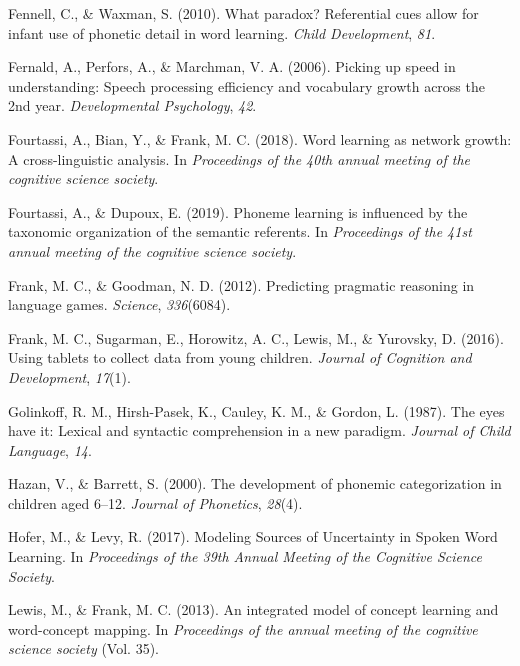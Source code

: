 \documentclass[english,,man]{apa6}
\begin{document}
\leavevmode\hypertarget{ref-fennell2010}{}%
Fennell, C., \& Waxman, S. (2010). What paradox? Referential cues allow for infant use of phonetic detail in word learning. \emph{Child Development}, \emph{81}.

\leavevmode\hypertarget{ref-fernald2006}{}%
Fernald, A., Perfors, A., \& Marchman, V. A. (2006). Picking up speed in understanding: Speech processing efficiency and vocabulary growth across the 2nd year. \emph{Developmental Psychology}, \emph{42}.

\leavevmode\hypertarget{ref-fourtassi2018}{}%
Fourtassi, A., Bian, Y., \& Frank, M. C. (2018). Word learning as network growth: A cross-linguistic analysis. In \emph{Proceedings of the 40th annual meeting of the cognitive science society}.

\leavevmode\hypertarget{ref-fourtassi2019}{}%
Fourtassi, A., \& Dupoux, E. (2019). Phoneme learning is influenced by the taxonomic organization of the semantic referents. In \emph{Proceedings of the 41st annual meeting of the cognitive science society}.

\leavevmode\hypertarget{ref-frank2012}{}%
Frank, M. C., \& Goodman, N. D. (2012). Predicting pragmatic reasoning in language games. \emph{Science}, \emph{336}(6084).

\leavevmode\hypertarget{ref-frank2016}{}%
Frank, M. C., Sugarman, E., Horowitz, A. C., Lewis, M., \& Yurovsky, D. (2016). Using tablets to collect data from young children. \emph{Journal of Cognition and Development}, \emph{17}(1).

\leavevmode\hypertarget{ref-golinkoff1987}{}%
Golinkoff, R. M., Hirsh-Pasek, K., Cauley, K. M., \& Gordon, L. (1987). The eyes have it: Lexical and syntactic comprehension in a new paradigm. \emph{Journal of Child Language}, \emph{14}.

\leavevmode\hypertarget{ref-hazan2000}{}%
Hazan, V., \& Barrett, S. (2000). The development of phonemic categorization in children aged 6--12. \emph{Journal of Phonetics}, \emph{28}(4).

\leavevmode\hypertarget{ref-hofer2017}{}%
Hofer, M., \& Levy, R. (2017). Modeling Sources of Uncertainty in Spoken Word Learning. In \emph{Proceedings of the 39th Annual Meeting of the Cognitive Science Society}.

\leavevmode\hypertarget{ref-lewis2013}{}%
Lewis, M., \& Frank, M. C. (2013). An integrated model of concept learning and word-concept mapping. In \emph{Proceedings of the annual meeting of the cognitive science society} (Vol. 35).
\end{document}
